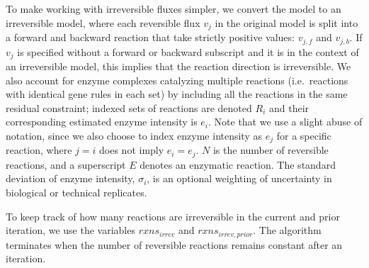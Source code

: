 To make working with irreversible fluxes simpler, we convert the model
to an irreversible model, where each reversible flux $v_j$ in the
original model is split into a forward and backward reaction that take
strictly positive values: $v_{j,f}$ and $v_{j,b}$. If $v_j$ is
specified without a forward or backward subscript and it is in the
context of an irreversible model, this implies that the reaction
direction is irreversible. We also account for enzyme complexes
catalyzing multiple reactions (i.e.\ reactions with identical gene
rules in each set) by including all the reactions in the same residual
constraint; indexed sets of reactions are denoted $R_i$ and their
corresponding estimated enzyme intensity is $e_i$. Note that we use a
slight abuse of notation, since we also choose to index enzyme
intensity as $e_j$ for a specific reaction, where $j = i$ does not
imply $e_i = e_j$. $N$ is the number of reversible reactions, and a
superscript $E$ denotes an enzymatic reaction. The standard deviation
of enzyme intensity, $\sigma_i$, is an optional weighting of
uncertainty in biological or technical replicates.

To keep track of how many reactions are irreversible in the current
and prior iteration, we use the variables $rxns_{irrev}$ and
$rxns_{irrev,prior}$. The algorithm terminates when the number of
reversible reactions remains constant after an iteration.

